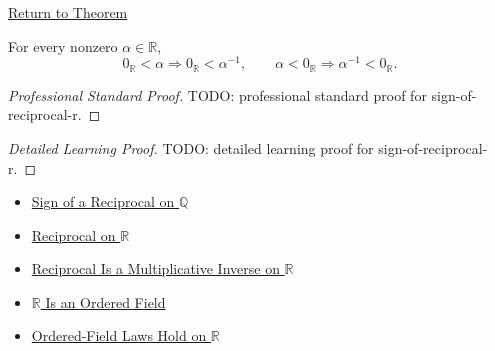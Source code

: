 \newpage
{}
\label{prf:sign-of-reciprocal-r}

\begin{remark*}[Return]
\hyperref[thm:sign-of-reciprocal-r]{Return to Theorem}
\end{remark*}

\begin{theorem*}
For every nonzero $\alpha\in\mathbb{R}$,
\[
0_{\mathbb{R}}<\alpha \Longrightarrow 0_{\mathbb{R}}<\alpha^{-1},
\qquad
\alpha<0_{\mathbb{R}} \Longrightarrow \alpha^{-1}<0_{\mathbb{R}}.
\]
\end{theorem*}

\begin{proof}[Professional Standard Proof]
\LRAProofBodyStart
TODO: professional standard proof for sign-of-reciprocal-r.
\end{proof}

\begin{proof}[Detailed Learning Proof]
\LRAProofBodyStart
TODO: detailed learning proof for sign-of-reciprocal-r.
\end{proof}

\begin{remark*}
\end{remark*}

\begin{dependencies}
\begin{itemize}
  \item \hyperref[thm:sign-of-reciprocal-q]{Sign of a Reciprocal on $\mathbb{Q}$}
  \item \hyperref[def:reciprocal-on-r]{Reciprocal on $\mathbb{R}$}
  \item \hyperref[thm:reciprocal-multiplicative-inverse-on-r]{Reciprocal Is a Multiplicative Inverse on $\mathbb{R}$}
  \item \hyperref[thm:r-is-an-ordered-field]{$\mathbb{R}$ Is an Ordered Field}
  \item \hyperref[cor:ordered-field-laws-on-r]{Ordered-Field Laws Hold on $\mathbb{R}$}
\end{itemize}
\end{dependencies}

\clearpage

